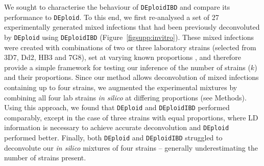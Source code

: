 \documentclass[9pt,lineno]{elife}
\begin{document}
We sought to characterise the behaviour of \texttt{DEploidIBD} and compare its performance to \texttt{DEploid}.  To this end, we first re-analysed a set of 27 experimentally generated mixed infections \citep{Wendler2015} that had been previously deconvoluted by \texttt{DEploid} \citep{Zhu2017} using \texttt{DEploidIBD} (Figure~\ref{figsupp:invitro}). These mixed infections were created with combinations of two or three laboratory strains (selected from 3D7, Dd2, HB3 and 7G8), set at varying known proportions \citep{Wendler2015}, and therefore provide a simple framework for testing our inference of the number of strains ($k$) and their proportions. Since our method allows deconvolution of mixed infections containing up to four strains, we augmented the experimental mixtures by combining all four lab strains {\it in silico} at differing proportions (see Methods). Using this approach, we found that \texttt{DEploid} and \texttt{DEploidIBD} performed comparably, except in the case of three strains with equal proportions, where LD information is necessary to achieve accurate deconvolution and \texttt{DEploid} performed better. Finally, both \texttt{DEploid} and \texttt{DEploidIBD} struggled to deconvolute our {\it in silico} mixtures of four strains -- generally underestimating the number of strains present.
\end{document}
